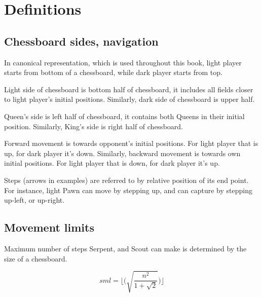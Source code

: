 

\chapter*{Definitions}
\label{ch:Definitions}

\section*{Chessboard sides, navigation}
\label{sec:Definitions/Chessboard sides, navigation}

In canonical representation, which is used throughout this book, light player
starts from bottom of a chessboard, while dark player starts from top.

Light side of chessboard is bottom half of chessboard, it includes all fields
closer to light player's initial positions. Similarly, dark side of chessboard
is upper half.

Queen's side is left half of chessboard, it contains both Queens in their
initial position. Similarly, King's side is right half of chessboard.

Forward movement is towards opponent's initial positions. For light player
that is up, for dark player it's down. Similarly, backward movement is towards
own initial positions. For light player that is down, for dark player it's up.

Steps (arrows in examples) are referred to by relative position of its end point.
For instance, light Pawn can move by stepping up, and can capture by stepping
up-left, or up-right.

\clearpage %

\section*{Movement limits}
\label{sec:Definitions/Movement limits}

Maximum number of steps Serpent, and Scout can make is determined by the size
of a chessboard.

\begin{equation}
sml = \lfloor \bigg( \sqrt{ \frac{n^2}{1 + \sqrt{2}} } \bigg) \rfloor
\end{equation}

